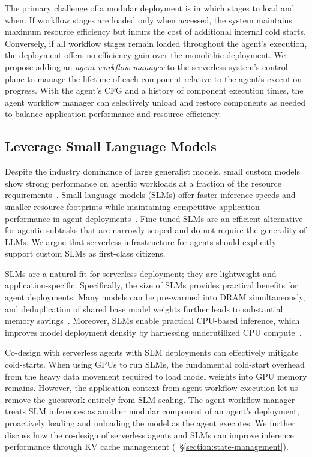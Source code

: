 The primary challenge of a modular deployment is in which stages to load and when.
If workflow stages are loaded only when accessed, the system maintains maximum resource efficiency but incurs the cost of additional internal cold starts.
Conversely, if all workflow stages remain loaded throughout the agent's execution, the deployment offers no efficiency gain over the monolithic deployment.
We propose adding an \textit{agent workflow manager} to the serverless system's control plane to manage the lifetime of each component relative to the agent's execution progress.
With the agent's CFG and a history of component execution times, the agent workflow manager can selectively unload and restore components as needed to balance application performance and resource efficiency.


\subsection{Leverage Small Language Models}

Despite the industry dominance of large generalist models, small custom models show strong performance on agentic workloads at a fraction of the resource requirements~\cite{belcak2025smalllanguagemodelsfuture}.
Small language models (SLMs) offer faster inference speeds and smaller resource footprints while maintaining competitive application performance in agent deployments~\cite{belcak2025smalllanguagemodelsfuture}.
Fine-tuned SLMs are an efficient alternative for agentic subtasks that are narrowly scoped and do not require the generality of LLMs.
We argue that serverless infrastructure for agents should explicitly support custom SLMs as first-class citizens.

SLMs are a natural fit for serverless deployment; they are lightweight and application-specific.
Specifically, the size of SLMs provides practical benefits for agent deployments:
Many models can be pre-warmed into DRAM simultaneously, and deduplication of shared base model weights further leads to substantial memory savings~\cite{serverlesslora}.
Moreover, SLMs enable practical CPU-based inference, which improves model deployment density by harnessing underutilized CPU compute~\cite{slinfer}.


Co-design with serverless agents with SLM deployments can effectively mitigate cold-starts. 
When using GPUs to run SLMs, the fundamental cold-start overhead from the heavy data movement required to load model weights into GPU memory remains.
However, the application context from agent workflow execution let us remove the guesswork entirely from SLM scaling.
The agent workflow manager treats SLM inferences as another modular component of an agent's deployment, proactively loading and unloading the model as the agent executes.
We further discuss how the co-design of serverless agents and SLMs can improve inference performance through KV cache management (~\S\ref{section:state-management}).

